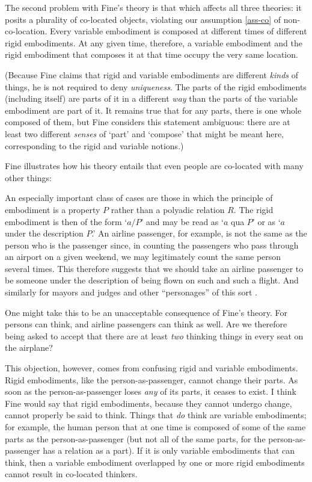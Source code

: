 \documentclass[12pt,twoside]{reedfancy}
\newenvironment{squote}{%
	\begin{spacing}{1}
	\begin{list}{}{%
	\setlength{\labelwidth}{0pt}%
	\rightmargin\leftmargin%
	}
	\item\relax
	}{%
	\end{list}%
	\end{spacing}
	}
\begin{document}
\begin{spacing}{1.25}
The second problem with Fine's theory is that which affects all three
theories: it posits a plurality of co-located objects, violating our
assumption \ref{ass-co} of non-co-location.  Every variable embodiment
is composed at different times of different rigid embodiments.  At any
given time, therefore, a variable embodiment and the rigid embodiment
that composes it at that time occupy the very same location.

(Because Fine claims that rigid and variable embodiments are different
{\em kinds} of things, he is not required to deny {\em uniqueness}.
The parts of the rigid embodiments (including itself) are parts of it
in a different {\em way} than the parts of the variable embodiment are
part of it.  It remains true that for any parts, there is one whole
composed of them, but Fine considers this statement ambiguous: there
are at least two different {\em senses} of `part' and `compose' that
might be meant here, corresponding to the rigid and variable notions.)

Fine illustrates how his theory entails that even people are
co-located with many other things:

\begin{squote}
An especially important class of cases are those in which the
principle of embodiment is a property $P$ rather than a polyadic
relation $R$.  The rigid embodiment is then of the form `$a/P$' and
may be read as `$a$ qua $P$' or as `$a$ under the description $P$.'
An airline passenger, for example, is not the same as the person who
is the passenger since, in counting the passengers who pass through an
airport on a given weekend, we may legitimately count the same person
several times.  This therefore suggests that we should take an airline
passenger to be someone under the description of being flown on such
and such a flight.  And similarly for mayors and judges and other
``personages'' of this sort \citeyearpar[67--68]{fine1999}.
\end{squote}

One might take this to be an unacceptable consequence of Fine's
theory.  For persons can think, and airline passengers can think as
well.  Are we therefore being asked to accept that there are at least
{\em two} thinking things in every seat on the airplane?

This objection, however, comes from confusing rigid and variable
embodiments.  Rigid embodiments, like the person-as-passenger, cannot
change their parts.  As soon as the person-as-passenger loses {\em
  any} of its parts, it ceases to exist.  I think Fine would say that
rigid embodiments, because they cannot undergo change, cannot properly
be said to think.  Things that {\em do} think are variable
embodiments; for example, the human person that at one time is
composed of some of the same parts as the person-as-passenger (but not
all of the same parts, for the person-as-passenger has a relation as a
part).  If it is only variable embodiments that can think, then a
variable embodiment overlapped by one or more rigid embodiments cannot
result in co-located thinkers.


\end{spacing}
\end{document}
